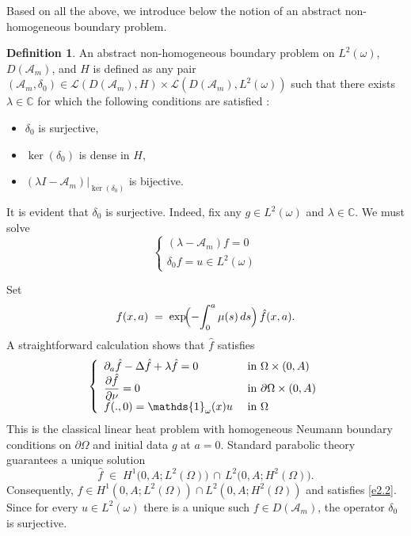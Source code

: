 \documentclass[10pt, a4]{amsart}
\theoremstyle{plain}
\theoremstyle{definition}
\newtheorem{definition}[lemma]{Definition}
\theoremstyle{remark}
\numberwithin{equation}{section}
\begin{document}
Based on all the above, we introduce below the notion of an abstract non-homogeneous boundary problem.
\begin{definition}\cite{ref48}\label{d2.2}
 An abstract non-homogeneous boundary problem on \( L^2(\omega) \), \( D(\mathcal{A}_m) \), and \( H \) is defined as any pair \( (\mathcal{A}_m, \delta_0) \in \mathcal{L}(D(\mathcal{A}_m), H) \times \mathcal{L}(D(\mathcal{A}_m), L^2(\omega)) \) such that there exists \( \lambda \in \mathbb{C} \) for which the following conditions are satisfied : 
\begin{itemize} 
\item[1.] \( \delta_0 \) is surjective,  
\item[2.] \( \ker (\delta_0) \) is dense in \( H \),  
\item[3.] \( (\lambda I -\mathcal{A}_m)|_{\ker (\delta_0)} \) is bijective.
\end{itemize}
\end{definition} 
 It is evident that \(\delta_{0}\) is surjective. Indeed, fix any \(g \in L^{2}(\omega)\) and \(\lambda \in \mathbb{C}\). We must solve  
 \begin{equation}\label{e2.2}
	\left\lbrace\begin{array}{ll}
	\left(\lambda-\mathcal{A}_m\right)f=0\\
	\delta_0f=u\in L^2(\omega)
	\end{array}\right.
\end{equation}

 Set  
 \[
   f(x,a) \;=\; \exp\!\Bigl(-\!\int_{0}^{a}\mu(s)\,ds\Bigr)\,\hat f(x,a).
 \]
 A straightforward calculation shows that \(\hat f\) satisfies  
 \begin{equation}
	\left\lbrace\begin{array}{ll}
		\partial_a\hat{f}-\Delta\hat{f}+\lambda \hat{f}=0&\hbox{ in }\Omega\times(0,A)\\
		\dfrac{\partial \hat{f}}{\partial \nu}=0&\hbox{ in }\partial\Omega\times(0,A)\\
		\hat{f}(.,0)=\mathds{1}_{\omega}(x)u&\hbox{ in }\Omega
	\end{array}\right.
\end{equation}
 This is the classical linear heat  problem with homogeneous Neumann boundary conditions on \(\partial\Omega\) and initial data \(g\) at \(a=0\). Standard parabolic theory guarantees a unique solution  
 \[
   \hat f \;\in\; H^{1}\bigl(0,A;L^{2}(\Omega)\bigr)\,\cap\,L^{2}\bigl(0,A;H^{2}(\Omega)\bigr).
 \]
 Consequently, \(f\in H^1(0,A;L^2(\Omega)) \cap L^2(0,A;H^2(\Omega))\) and satisfies \eqref{e2.2}. Since for every \(u \in L^{2}(\omega)\) there is a unique such \(f\in D(\mathcal{A}_{m})\), the operator \(\delta_{0}\) is surjective.
\end{document}
